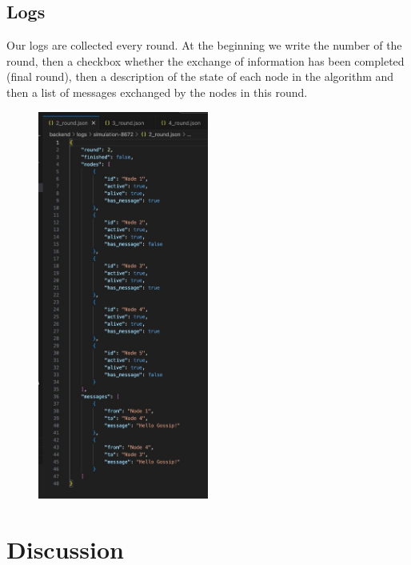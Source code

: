 \documentclass[a4paper,12pt]{article}
\begin{document}
\subsection{Logs}
Our logs are collected every round. At the beginning we write the number of the round, then a checkbox whether the exchange of information has been completed (final round), then a description of the state of each node in the algorithm and then a list of messages exchanged by the nodes in this round. 
\begin{figure}[H]
    \centering
    \includegraphics[width=0.5\textwidth]{figures/logs.jpg}
    \label{fig:screenshot2}
\end{figure}

\section{Discussion}
\end{document}
